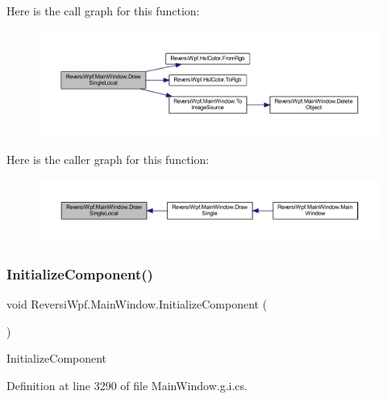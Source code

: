 Here is the call graph for this function\+:\nopagebreak
\begin{figure}[H]
\begin{center}
\leavevmode
\includegraphics[width=350pt]{class_reversi_wpf_1_1_main_window_a88fd4a18ce06e08801a3370147bc3a8b_cgraph}
\end{center}
\end{figure}
Here is the caller graph for this function\+:\nopagebreak
\begin{figure}[H]
\begin{center}
\leavevmode
\includegraphics[width=350pt]{class_reversi_wpf_1_1_main_window_a88fd4a18ce06e08801a3370147bc3a8b_icgraph}
\end{center}
\end{figure}
\mbox{\label{class_reversi_wpf_1_1_main_window_a4cf9bc92cee02fa8e3b00fa56fb41c82}} 
\subsubsection{\texorpdfstring{Initialize\+Component()}{InitializeComponent()}\hspace{0.1cm}{\footnotesize\ttfamily [1/4]}}
{\footnotesize\ttfamily void Reversi\+Wpf.\+Main\+Window.\+Initialize\+Component (\begin{DoxyParamCaption}{ }\end{DoxyParamCaption})}



Initialize\+Component 



Definition at line 3290 of file Main\+Window.\+g.\+i.\+cs.

